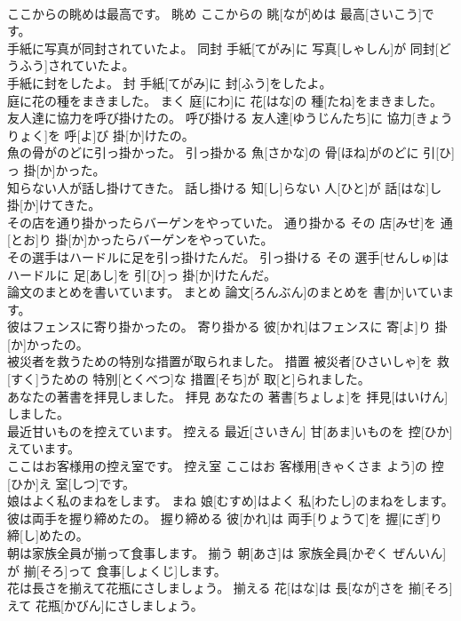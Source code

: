 \documentclass[8pt]{extreport}
\begin{document}
\begin{CJK}{UTF8}{min}
\\	ここからの眺めは最高です。	眺め	ここからの 眺[なが]めは 最高[さいこう]です。	
\\	手紙に写真が同封されていたよ。	同封	手紙[てがみ]に 写真[しゃしん]が 同封[どうふう]されていたよ。	
\\	手紙に封をしたよ。	封	手紙[てがみ]に 封[ふう]をしたよ。	
\\	庭に花の種をまきました。	まく	庭[にわ]に 花[はな]の 種[たね]をまきました。	
\\	友人達に協力を呼び掛けたの。	呼び掛ける	友人達[ゆうじんたち]に 協力[きょうりょく]を 呼[よ]び 掛[か]けたの。	
\\	魚の骨がのどに引っ掛かった。	引っ掛かる	魚[さかな]の 骨[ほね]がのどに 引[ひ]っ 掛[か]かった。	
\\	知らない人が話し掛けてきた。	話し掛ける	知[し]らない 人[ひと]が 話[はな]し 掛[か]けてきた。	
\\	その店を通り掛かったらバーゲンをやっていた。	通り掛かる	その 店[みせ]を 通[とお]り 掛[か]かったらバーゲンをやっていた。	
\\	その選手はハードルに足を引っ掛けたんだ。	引っ掛ける	その 選手[せんしゅ]はハードルに 足[あし]を 引[ひ]っ 掛[か]けたんだ。	
\\	論文のまとめを書いています。	まとめ	論文[ろんぶん]のまとめを 書[か]いています。	
\\	彼はフェンスに寄り掛かったの。	寄り掛かる	彼[かれ]はフェンスに 寄[よ]り 掛[か]かったの。	
\\	被災者を救うための特別な措置が取られました。	措置	被災者[ひさいしゃ]を 救[すく]うための 特別[とくべつ]な 措置[そち]が 取[と]られました。	
\\	あなたの著書を拝見しました。	拝見	あなたの 著書[ちょしょ]を 拝見[はいけん]しました。	
\\	最近甘いものを控えています。	控える	最近[さいきん] 甘[あま]いものを 控[ひか]えています。	
\\	ここはお客様用の控え室です。	控え室	ここはお 客様用[きゃくさま よう]の 控[ひか]え 室[しつ]です。	
\\	娘はよく私のまねをします。	まね	娘[むすめ]はよく 私[わたし]のまねをします。	
\\	彼は両手を握り締めたの。	握り締める	彼[かれ]は 両手[りょうて]を 握[にぎ]り 締[し]めたの。	
\\	朝は家族全員が揃って食事します。	揃う	朝[あさ]は 家族全員[かぞく ぜんいん]が 揃[そろ]って 食事[しょくじ]します。	
\\	花は長さを揃えて花瓶にさしましょう。	揃える	花[はな]は 長[なが]さを 揃[そろ]えて 花瓶[かびん]にさしましょう。	

\end{CJK}
\end{document}
